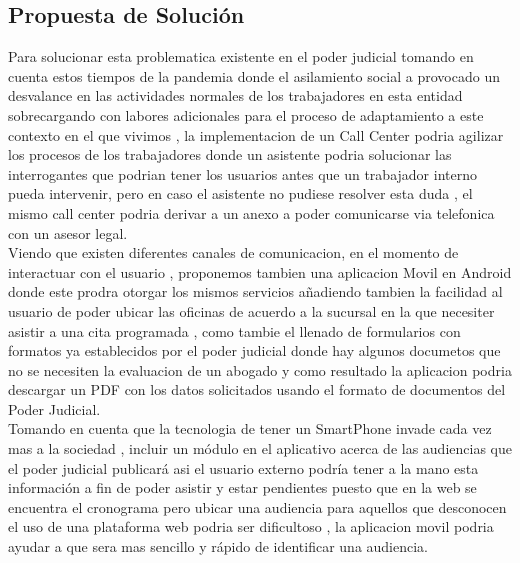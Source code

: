 \documentclass[twoside,twocolumn]{article}
\begin{document}
\subsection{Propuesta de Solución}
Para solucionar esta problematica existente en el poder judicial tomando en cuenta estos tiempos de la pandemia donde el asilamiento social a provocado un desvalance en las actividades normales de los trabajadores en esta entidad sobrecargando con labores adicionales para el proceso de adaptamiento a este contexto en el que vivimos , la implementacion de un Call Center podria agilizar los procesos de los trabajadores donde un asistente podria solucionar las interrogantes que podrian tener los usuarios antes que un trabajador interno pueda intervenir, pero en caso el asistente no pudiese resolver esta duda , el mismo call center podria derivar a un anexo a poder comunicarse via telefonica con un asesor legal.
\\
Viendo que existen diferentes canales de comunicacion,  en el momento de interactuar con el usuario , proponemos tambien una aplicacion Movil en Android donde este prodra otorgar los mismos servicios añadiendo tambien la facilidad al usuario de poder ubicar las oficinas de acuerdo a la sucursal en la que necesiter asistir a una cita programada , como tambie  el llenado de formularios con formatos ya establecidos por el poder judicial donde hay algunos documetos que no se necesiten la evaluacion de un abogado y como resultado la aplicacion podria descargar un PDF con los datos solicitados usando el formato de documentos del Poder Judicial.
\\
Tomando en cuenta que la tecnologia de tener un SmartPhone invade cada vez mas a la sociedad , incluir un módulo en el aplicativo acerca de las audiencias que el poder judicial publicará asi el usuario externo podría tener a la mano esta información a fin de poder asistir y estar pendientes puesto que en la web se encuentra el cronograma pero ubicar una audiencia para aquellos que desconocen el uso de una plataforma web podria ser dificultoso , la aplicacion movil podria ayudar a que sera mas sencillo y rápido de identificar una audiencia.
\end{document}
